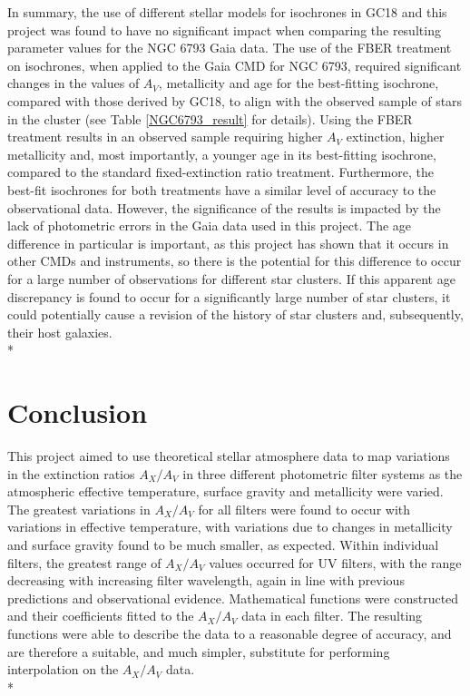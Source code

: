 \documentclass[12pt, a4paper]{report}
\begin{document}
In summary, the use of different stellar models for isochrones in GC18 and this project was found to have no significant impact when comparing the resulting parameter values for the NGC 6793 Gaia data. The use of the FBER treatment on isochrones, when applied to the Gaia CMD for NGC 6793, required significant changes in the values of $A_{V}$, metallicity and age for the best-fitting isochrone, compared with those derived by GC18, to align with the observed sample of stars in the cluster (see Table \ref{NGC6793_result} for details). Using the FBER treatment results in an observed sample requiring higher $A_{V}$ extinction, higher metallicity and, most importantly, a younger age in its best-fitting isochrone, compared to the standard fixed-extinction ratio treatment. Furthermore, the best-fit isochrones for both treatments have a similar level of accuracy to the observational data. However, the significance of the results is impacted by the lack of photometric errors in the Gaia data used in this project. The age difference in particular is important, as this project has shown that it occurs in other CMDs and instruments, so there is the potential for this difference to occur for a large number of observations for different star clusters. If this apparent age discrepancy is found to occur for a significantly large number of star clusters, it could potentially cause a revision of the history of star clusters and, subsequently, their host galaxies. \\*

\chapter{Conclusion}

This project aimed to use theoretical stellar atmosphere data to map variations in the extinction ratios $A_{X}/A_{V}$ in three different photometric filter systems as the atmospheric effective temperature, surface gravity and metallicity were varied. The greatest variations in $A_{X}/A_{V}$ for all filters were found to occur with variations in effective temperature, with variations due to changes in metallicity and surface gravity found to be much smaller, as expected. Within individual filters, the greatest range of $A_{X}/A_{V}$ values occurred for UV filters, with the range decreasing with increasing filter wavelength, again in line with previous predictions and observational evidence. Mathematical functions were constructed and their coefficients fitted to the $A_{X}/A_{V}$ data in each filter. The resulting functions were able to describe the data to a reasonable degree of accuracy, and are therefore a suitable, and much simpler, substitute for performing interpolation on the $A_{X}/A_{V}$ data. \\* 
\end{document}
